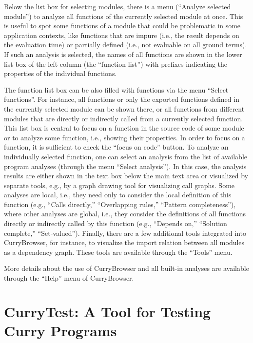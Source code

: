 \documentclass[11pt,fleqn]{article}
\newcommand{\cb}{CurryBrowser\xspace}
\begin{document}
Below the list box for selecting modules, there is a menu
(``Analyze selected module'') to analyze all functions
of the currently selected module at once. This is useful
to spot some functions of a module that could be problematic
in some application contexts, like functions that are impure (i.e., the result
depends on the evaluation time) or partially defined (i.e.,
not evaluable on all ground terms).
If such an analysis is selected,
the names of all functions are shown in the
lower list box of the left column (the ``function list'')
with prefixes indicating the properties of the individual functions.

The function list box can be also filled with functions
via the menu ``Select functions''. For instance, all functions
or only the exported functions defined in the currently selected
module can be shown there, or all functions from different modules
that are directly or indirectly called from
a currently selected function.
This list box is central to focus on a function in the
source code of some module or to analyze some function,
i.e., showing their properties. In order to focus on a function,
it is sufficient to check the ``focus on code'' button.
To analyze an individually selected function, one can
select an analysis from the list of available program analyses
(through the menu ``Select analysis'').
In this case, the analysis results are either shown
in the text box below the main text area
or visualized by separate tools, e.g., by a graph drawing tool for
visualizing call graphs.
Some analyses are local, i.e., they need only to consider the local definition
of this function (e.g., ``Calls directly,'' ``Overlapping rules,''
``Pattern completeness''),
where other analyses are global, i.e.,
they consider the definitions of all functions directly or indirectly called
by this function (e.g., ``Depends on,'' ``Solution complete,''
``Set-valued'').
%
Finally, there are a few additional tools integrated into \cb,
for instance, to visualize the import relation between all modules
as a dependency graph. These tools are available through the ``Tools'' menu.

More details about the use of \cb and all built-in analyses
are available through the ``Help'' menu of \cb.


\newpage

\section{CurryTest: A Tool for Testing Curry Programs}
\label{sec-currytest}
\end{document}
